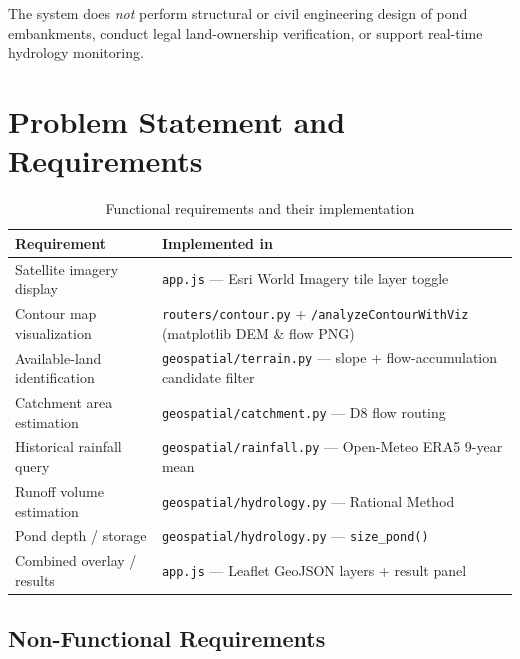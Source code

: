 \documentclass[manuscript,screen,review]{acmart}
\begin{document}
The system does \emph{not} perform structural or civil engineering
design of pond embankments, conduct legal land-ownership verification,
or support real-time hydrology monitoring.

\section{Problem Statement and Requirements}
\label{sec:requirements}

\begin{table}[h]
  \caption{Functional requirements and their implementation}
  \label{tab:requirements}
  \begin{tabular}{p{3.2cm}p{3.8cm}}
    \toprule
    Requirement & Implemented in \\
    \midrule
    Satellite imagery display     & \texttt{app.js} — Esri World Imagery tile layer toggle \\
    Contour map visualization     & \texttt{routers/contour.py} + \texttt{/analyzeContourWithViz} (matplotlib DEM \& flow PNG) \\
    Available-land identification & \texttt{geospatial/terrain.py} — slope + flow-accumulation candidate filter \\
    Catchment area estimation     & \texttt{geospatial/catchment.py} — D8 flow routing \\
    Historical rainfall query     & \texttt{geospatial/rainfall.py} — Open-Meteo ERA5 9-year mean \\
    Runoff volume estimation      & \texttt{geospatial/hydrology.py} — Rational Method \\
    Pond depth / storage          & \texttt{geospatial/hydrology.py} — \texttt{size\_pond()} \\
    Combined overlay / results    & \texttt{app.js} — Leaflet GeoJSON layers + result panel \\
    \bottomrule
  \end{tabular}
\end{table}

\subsection{Non-Functional Requirements}
\end{document}

